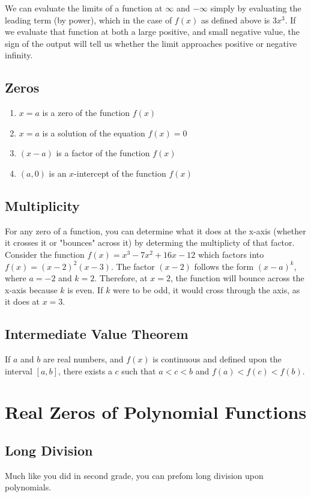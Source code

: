 We can evaluate the limits of a function at $\infty$ and $-\infty$ simply by
evaluating the leading term (by power), which in the case of $f(x)$ as defined
above is $3x^3$.  If we evaluate that function at both a large positive, and
small negative value, the sign of the output will tell us whether the limit
approaches positive or negative infinity.

\subsection{Zeros}
\begin{enumerate}
  \item $x=a$ is a zero of the function $f(x)$
  \item $x=a$ is a solution of the equation $f(x)=0$
  \item $(x-a)$ is a factor of the function $f(x)$
  \item $(a,0)$ is an $x$-intercept of the function $f(x)$
\end{enumerate}

\subsection{Multiplicity}
For any zero of a function, you can determine what it does at the x-axis
(whether it crosses it or "bounces" across it) by determing the multiplicty of
that factor.  Consider the function $f(x)=x^3-7x^2+16x-12$ which factors into
$f(x)=(x-2)^2(x-3)$.  The factor $(x-2)$ follows the form $(x-a)^k$, where
$a=-2$ and $k=2$.  Therefore, at $x=2$, the function will bounce across the
x-axis because $k$ is even.  If $k$ were to be odd, it would cross through the
axis, as it does at $x=3$.

\subsection{Intermediate Value Theorem}
If $a$ and $b$ are real numbers, and $f(x)$ is continuous and defined upon the
interval $[a,b]$, there exists a $c$ such that $a<c<b$ and $f(a)<f(c)<f(b)$.

\section{Real Zeros of Polynomial Functions}
\subsection{Long Division}
Much like you did in second grade, you can prefom long division upon
polynomials.

